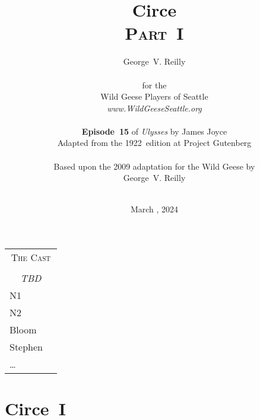 


\title{\Huge Circe \\
\Large \textsc{Part~I}}
\author{George~V. Reilly\\
\\
{\small for the}\\
Wild Geese Players of Seattle\\
{\textit{www.WildGeeseSeattle.org}}\\
\\
{\small \textbf{Episode~15}
of \textit{Ulysses}
by James Joyce}\\
{\small Adapted from the 1922~edition at Project Gutenberg}
\\
\\
{\small Based upon the 2009 adaptation for the Wild Geese by}\\
{\small George~V. Reilly}
\\
\\
}
\date{March ,
2024}
\raggedbottom



\maketitle
\thispagestyle{empty}
\pagebreak

\begin{tabular}{lp{10cm}}
    \multicolumn{2}{c}{\Large \textsc{The Cast}} \\
\\
    \multicolumn{2}{c}{\large \textit{TBD}} \\
N1 \\
N2 \\
Bloom \\
Stephen \\
\ldots
\end{tabular}

\thispagestyle{empty}

\pagebreak

\setcounter{page}{1}
\setcounter{section}{14}  %

\section*{Circe~I}



